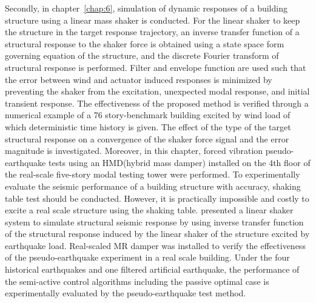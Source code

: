 Secondly, in chapter~\ref{chap:6}, simulation of dynamic responses of a building structure using a linear mass shaker is conducted. For the linear shaker to keep the structure in the target response trajectory, an inverse transfer function of a structural response to the shaker force is obtained using a state space form governing equation of the structure, and the discrete Fourier transform of structural response is performed. Filter and envelope function are used such that the error between wind and actuator induced responses is minimized by preventing the shaker from the excitation, unexpected modal response, and initial transient response. The effectiveness of the proposed method is verified through a numerical example of a 76 story-benchmark building excited by wind load of which deterministic time history is given. The effect of the type of the target structural response on a convergence of the shaker force signal and the error magnitude is investigated. Moreover, in this chapter, forced vibration pseudo-earthquake tests using an HMD(hybrid mass damper) installed on the 4th floor of the real-scale five-story modal testing tower were performed. To experimentally evaluate the seismic performance of a building structure with accuracy, shaking table test should be conducted. However, it is practically impossible and costly to excite a real scale structure using the shaking table. \citet{yu2005forced} presented a linear shaker system to simulate structural seismic response by using inverse transfer function of the structural response induced by the linear shaker of the structure excited by earthquake load. Real-scaled MR damper was installed to verify the effectiveness of the pseudo-earthquake experiment in a real scale building. Under the four historical earthquakes and one filtered artificial earthquake, the performance of the semi-active control algorithms including the passive optimal case is experimentally evaluated by the pseudo-earthquake test method.



